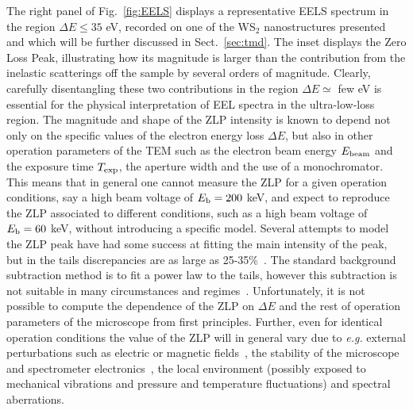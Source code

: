 The right panel of Fig.~\ref{fig:EELS} displays
a representative EELS spectrum in the region $\Delta E \le 35$ eV, recorded
on one of the WS$_2$ nanostructures presented~\cite{SabryaWS2}
and which will be further discussed in Sect.~\ref{sec:tmd}.
%
The inset displays the Zero Loss Peak, illustrating how
its magnitude is larger than the contribution from the inelastic scatterings
off the sample by several
orders of magnitude.
%
Clearly, carefully disentangling these two contributions in the region $\Delta E \simeq$ few eV
is essential for the physical interpretation of EEL spectra in the ultra-low-loss region.
%
The magnitude and shape of the ZLP intensity is known to depend not only on the specific values
of the electron energy loss $\Delta E$, but also in other operation parameters
of the TEM such as the electron beam energy $E_{\rm beam}$ and the exposure time
$T_{\rm exp}$, the aperture width and the use of a monochromator. 
%
This means that in general one cannot measure the ZLP for a given operation
conditions, say a high beam voltage of $E_{\rm b}=200$ keV, and expect to reproduce
the ZLP associated to different conditions, such as a  high beam voltage of $E_{\rm b}=60$ keV,
without introducing a specific model.
%
Several attempts to model the ZLP peak have had some success at fitting the main intensity of the peak, 
but in the tails discrepancies are as large as 25-35\%~\cite{Bangert:2003}. The standard background 
subtraction method is to fit a power law to the tails, however this subtraction is not suitable in
many circumstances and regimes~\cite{Hachtel:2018, Tenailleau:1992, Reed:2002, Bosman:2006}.
%
Unfortunately, it is not possible to compute the dependence of the ZLP on $\Delta E$
and the rest of operation parameters of the microscope from first principles.
%
Further, even for identical operation conditions the value of the ZLP
will in general vary due to {\it e.g.} external perturbations such as electric or magnetic fields~\cite{Rafferty:2000},
the stability of the microscope and spectrometer electronics~\cite{Kothleitner:2003}, the local
environment (possibly exposed to mechanical vibrations and pressure and temperature fluctuations) 
and spectral aberrations\cite{Egerton:1996, Scherzer:1949}. 
%

